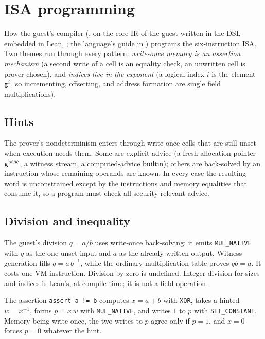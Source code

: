 \section{ISA programming}\label{sec:isa-programming}

How the guest's compiler (, on the core IR of the guest written in the DSL embedded in Lean, ; the language's guide in ) programs the six-instruction ISA. Two themes run through every pattern: \emph{write-once memory is an assertion mechanism} (a second write of a cell is an equality check, an unwritten cell is prover-chosen), and \emph{indices live in the exponent} (a logical index $i$ is the element $\mathsf{g}^{i}$, so incrementing, offsetting, and address formation are single field multiplications).

\subsection{Hints}\label{sec:prog-hints}

The prover's nondeterminism enters through write-once cells that are still unset when execution needs them. Some are explicit advice (a fresh allocation pointer $\mathsf{g}^{\mathrm{base}}$, a witness stream, a computed-advice builtin); others are back-solved by an instruction whose remaining operands are known. In every case the resulting word is unconstrained except by the instructions and memory equalities that consume it, so a program must check all security-relevant advice.

\subsection{Division and inequality}\label{sec:prog-div-ne}

The guest's division $q=a/b$ uses write-once back-solving: it emits \texttt{MUL\_NATIVE} with $q$ as the one unset input and $a$ as the already-written output. Witness generation fills $q=a\,b^{-1}$, while the ordinary multiplication table proves $q b=a$. It costs one VM instruction. Division by zero is undefined. Integer division for sizes and indices is Lean's, at compile time; it is not a field operation.

The assertion \texttt{assert a != b} computes $x=a+b$ with \texttt{XOR}, takes a hinted $w=x^{-1}$, forms $p=x\,w$ with \texttt{MUL\_NATIVE}, and writes $1$ to $p$ with \texttt{SET\_CONSTANT}. Memory being write-once, the two writes to $p$ agree only if $p=1$, and $x=0$ forces $p=0$ whatever the hint.

